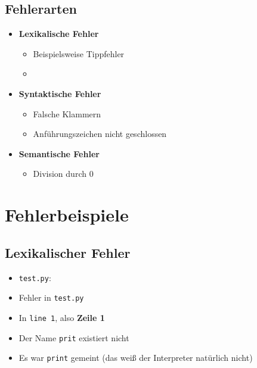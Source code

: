 \subsection{Fehlerarten}
\begin{frame}
	\slidehead
	\begin{itemize}
		\item \textbf{Lexikalische Fehler}
		\begin{itemize}
			\item Beispielsweise Tippfehler
			\item {}
		\end{itemize}
		\item \textbf{Syntaktische Fehler}
		\begin{itemize}
			\item Falsche Klammern
			\item Anführungszeichen nicht geschlossen
		\end{itemize}
		\item \textbf{Semantische Fehler}
		\begin{itemize}
			\item Division durch 0
		\end{itemize}
	\end{itemize}
\end{frame}

\section{Fehlerbeispiele}
\subsection{Lexikalischer Fehler}
\begin{frame}
	\slidehead
	\begin{itemize}
		\item \texttt{test.py}:
		\pause
		\pause
		\item Fehler in \texttt{test.py}
		\pause
		\item In \texttt{line 1}, also \textbf{Zeile 1}
		\pause
		\item Der Name \texttt{prit} existiert nicht
		\pause
		\item Es war \texttt{print} gemeint (das weiß der Interpreter natürlich nicht)
	\end{itemize}
\end{frame}

